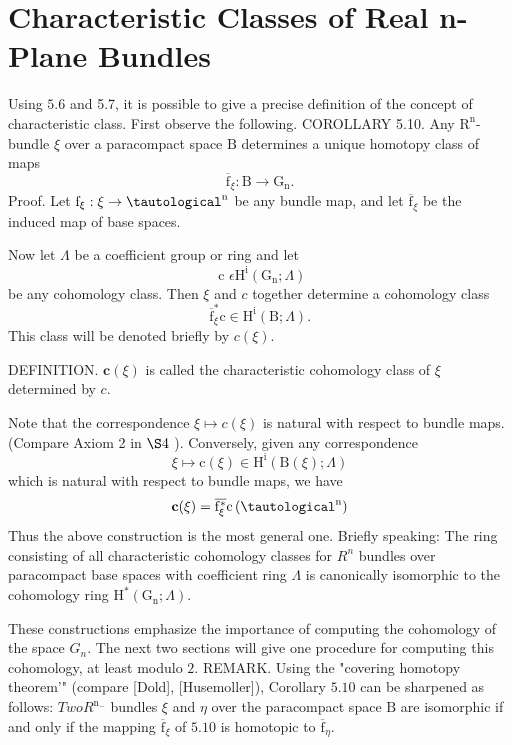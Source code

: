 \documentclass[10pt]{article}
\begin{document}
\section{Characteristic Classes of Real n-Plane Bundles}
Using $5.6$ and 5.7, it is possible to give a precise definition of the concept of characteristic class. First observe the following. COROLLARY 5.10. Any $\mathrm{R}^{\mathrm{n}}$-bundle $\xi$ over a paracompact space $\mathrm{B}$ determines a unique homotopy class of maps
$$
\overline{\mathrm{f}}_{\xi}: \mathrm{B} \rightarrow \mathrm{G}_{\mathrm{n}} .
$$
Proof. Let $\mathrm{f}_{\xi}: \xi \rightarrow \tautological^{\mathrm{n}}$ be any bundle map, and let $\overline{\mathrm{f}}_{\xi}$ be the induced map of base spaces.

Now let $\Lambda$ be a coefficient group or ring and let
$$
\text { c } \epsilon \mathrm{H}^{\mathrm{i}}\left(\mathrm{G}_{\mathrm{n}} ; \Lambda\right)
$$
be any cohomology class. Then $\xi$ and $c$ together determine a cohomology class
$$
\overline{\mathrm{f}}_{\xi}^{*} \mathrm{c} \in \mathrm{H}^{\mathrm{i}}(\mathrm{B} ; \Lambda) .
$$
This class will be denoted briefly by $c(\xi)$.

DEFINITION. $\mathbf{c}(\xi)$ is called the characteristic cohomology class of $\xi$ determined by $c$.

Note that the correspondence $\xi \mapsto c(\xi)$ is natural with respect to bundle maps. (Compare Axiom 2 in $\S 4$ ). Conversely, given any correspondence
$$
\xi \mapsto \mathrm{c}(\xi) \in \mathrm{H}^{\mathrm{i}}(\mathrm{B}(\xi) ; \Lambda)
$$
which is natural with respect to bundle maps, we have
$$
\mathbf{c}(\xi)=\overline{\mathrm{f}_{\xi}^{*}} \mathrm{c}\left(\tautological^{\mathrm{n}}\right)
$$
Thus the above construction is the most general one. Briefly speaking: The ring consisting of all characteristic cohomology classes for $R^{n}$ bundles over paracompact base spaces with coefficient ring $\Lambda$ is canonically isomorphic to the cohomology ring $\mathrm{H}^{*}\left(\mathrm{G}_{\mathrm{n}} ; \Lambda\right)$.

These constructions emphasize the importance of computing the cohomology of the space $G_{n}$. The next two sections will give one procedure for computing this cohomology, at least modulo $2 .$ REMARK. Using the "covering homotopy theorem'" (compare [Dold], [Husemoller]), Corollary $5.10$ can be sharpened as follows: $T w o R^{\mathrm{n}_{-}}$ bundles $\xi$ and $\eta$ over the paracompact space $\mathrm{B}$ are isomorphic if and only if the mapping $\overline{\mathrm{f}}_{\xi}$ of $5.10$ is homotopic to $\overline{\mathrm{f}}_{\eta}$.
\end{document}
